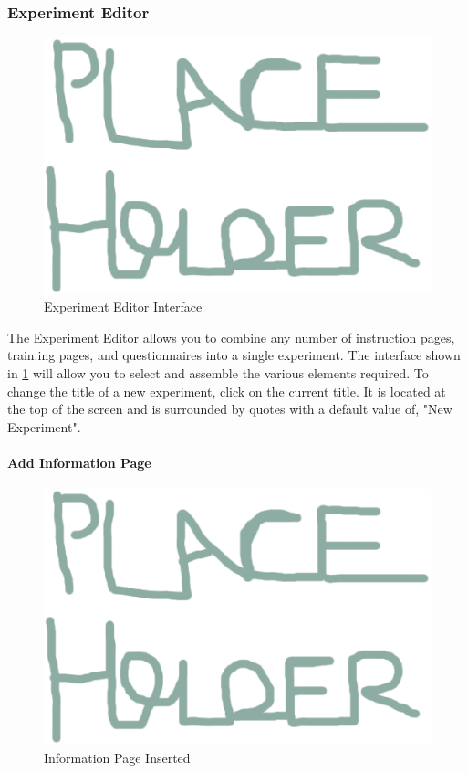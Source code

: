 \documentclass[article]{ij4uq}              %
\begin{document}
\subsubsection{Experiment Editor}

\begin{figure}[h!]
 \centering
 \includegraphics[width=5.0in]{figures/place.eps}
 \caption{Experiment Editor Interface}
 \label{fig:eeInterface}
\end{figure}
\FloatBarrier

The Experiment Editor allows you to combine any number of instruction pages, train.ing pages, and questionnaires into a single experiment. The interface shown in \ref{fig:eeInterface} will allow you to select and assemble the various elements required. To change the title of a new experiment, click on the current title. It is located at the top of the screen and is surrounded by quotes with a default value of, "New Experiment".

\paragraph{Add Information Page}

\begin{figure}[h!]
 \centering
 \includegraphics[width=5.0in]{figures/place.eps}
 \caption{Information Page Inserted}
 \label{fig:infoInsert}
\end{figure}
\FloatBarrier
\end{document}
